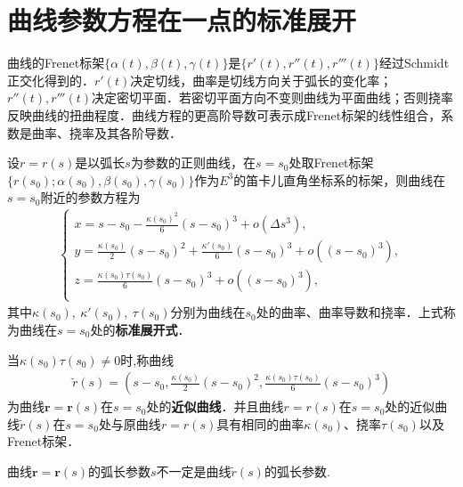 \documentclass[../../main.tex]{subfiles}%
\begin{document}
\section{曲线参数方程在一点的标准展开}

曲线的Frenet标架$\{\alpha(t),\beta(t),\gamma(t)\}$是$\{r'(t),r''(t),r'''(t)\}$经过Schmidt正交化得到的．$r'(t)$决定切线，曲率是切线方向关于弧长的变化率；$r''(t),r'''(t)$决定密切平面．若密切平面方向不变则曲线为平面曲线；否则挠率反映曲线的扭曲程度．曲线方程的更高阶导数可表示成Frenet标架的线性组合，系数是曲率、挠率及其各阶导数．

\begin{theorem}
设$r=r(s)$是以弧长$s$为参数的正则曲线，在$s=s_0$处取Frenet标架$\{r(s_0);\alpha(s_0),\beta(s_0),\gamma(s_0)\}$作为$E^3$的笛卡儿直角坐标系的标架，则曲线在$s=s_0$附近的参数方程为
\begin{align}\label{eq::ho239032jfjijefjs}
\begin{cases}
x=s-s_0-\frac{\kappa (s_0)^2}{6}\left( s-s_0 \right) ^3+o(\Delta s^3),\\
y=\frac{\kappa (s_0)}{2}\left( s-s_0 \right) ^2+\frac{\kappa '(s_0)}{6}\left( s-s_0 \right) ^3+o(\left( s-s_0 \right) ^3),\\
z=\frac{\kappa (s_0)\tau (s_0)}{6}\left( s-s_0 \right) ^3+o(\left( s-s_0 \right) ^3),\\
\end{cases}
\end{align}
其中$\kappa(s_0),\ \kappa'(s_0),\ \tau(s_0)$分别为曲线在$s_0$处的曲率、曲率导数和挠率．上式称为曲线在$s=s_0$处的\textbf{标准展开式}．

当$\kappa(s_0)\tau(s_0) \neq 0$时,称曲线
\begin{align*}
\tilde{r}(s)=\left( s-s_0, \frac{\kappa (s_0)}{2}\left( s-s_0 \right) ^2, \frac{\kappa (s_0)\tau (s_0)}{6}\left( s-s_0 \right) ^3 \right) 
\end{align*}
为曲线$\bm{r}=\bm{r}(s)$在$s=s_0$处的\textbf{近似曲线}．并且曲线$r=r(s)$在$s=s_0$处的近似曲线$\tilde{r}(s)$在$s=s_0$处与原曲线$r=r(s)$具有相同的曲率$\kappa(s_0)$、挠率$\tau(s_0)$以及Frenet标架．
\end{theorem}
\begin{remark}
曲线$\bm{r}=\bm{r}(s)$的弧长参数$s$不一定是曲线$\tilde{r}(s)$的弧长参数.
\end{remark}
\end{document}
